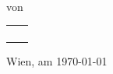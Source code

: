\begin{titlepage}
\begin{center}
			\vspace*{\fill}
			
			{\large \betreuer}\\
			{\normalsize \href{mailto:\betreueremail}{\betreueremail}}
			
			\vspace*{\fill}
			
			{\Large von}\\
			
			\begin{tabular}{p{0.4\textwidth}p{}} %
				\begin{center}
					{\large \mnsaGroup}\\
					
					\vspace*{5mm}
					
					{\large \studentA}\\
					{\large \studentB}\\
				\end{center}				
			\end{tabular}
			\vspace*{\fill}
			

			
			\vspace*{\fill}
			
			{\large Wien, am \today}
		\end{center}
	\end{titlepage}